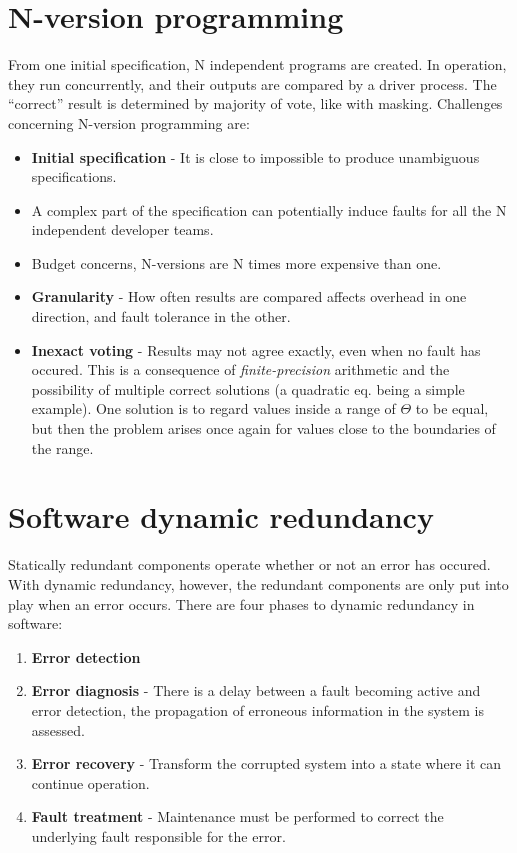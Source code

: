 \section{N-version programming}
From one initial specification, N independent programs are created. In operation, they run concurrently, and their outputs are compared by a driver process. The ``correct'' result is determined by majority of vote, like with masking. Challenges concerning N-version programming are:
\begin{itemize}
    \item \textbf{Initial specification} - It is close to impossible to produce unambiguous specifications.
    \item A complex part of the specification can potentially induce faults for all the N independent developer teams.
    \item Budget concerns, N-versions are N times more expensive than one.
    \item \textbf{Granularity} - How often results are compared affects overhead in one direction, and fault tolerance in the other.
    \item \textbf{Inexact voting} - Results may not agree exactly, even when no fault has occured. This is a consequence of \emph{finite-precision} arithmetic and the possibility of multiple correct solutions (a quadratic eq. being a simple example). One solution is to regard values inside a range of $\Theta$ to be equal, but then the problem arises once again for values close to the boundaries of the range.
\end{itemize}

\section{Software dynamic redundancy}
Statically redundant components operate whether or not an error has occured. With dynamic redundancy, however, the redundant components are only put into play when an error occurs. There are four phases to dynamic redundancy in software:
\begin{enumerate}
    \item \textbf{Error detection}
    \item \textbf{Error diagnosis} - There is a delay between a fault becoming active and error detection, the propagation of erroneous information in the system is assessed.
    \item \textbf{Error recovery} - Transform the corrupted system into a state where it can continue operation.
    \item \textbf{Fault treatment} - Maintenance must be performed to correct the underlying fault responsible for the error.
\end{enumerate}

